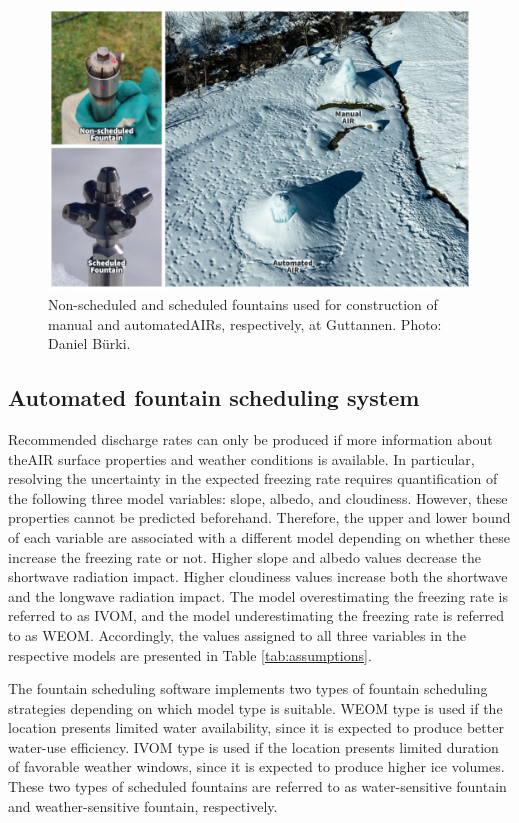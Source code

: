 \begin{figure}[htb]
	\includegraphics[width=\textwidth]{figs/AIR_fountains.jpg}
	\caption{Non-scheduled and scheduled fountains used for construction of manual and automated\ac{AIRs}, respectively, at
		Guttannen. Photo: Daniel Bürki.}
	\label{fig:autovsman}
\end{figure}

\subsection{Automated fountain scheduling system}

Recommended discharge rates can only be produced if more information about the\ac{AIR} surface properties and
weather conditions is available. In particular, resolving the uncertainty in the expected freezing rate requires
quantification of the following three model variables: slope, albedo, and cloudiness. However, these properties
cannot be predicted beforehand. Therefore, the upper and lower bound of each variable are associated with a
different model depending on whether these increase the freezing rate or not.  Higher slope and albedo values
decrease the shortwave radiation impact. Higher cloudiness values increase both the shortwave and the longwave
radiation impact. The model overestimating the freezing rate is referred to as \ac{IVOM}, and the model
underestimating the freezing rate is referred to as  \ac{WEOM}. Accordingly, the values
assigned to all three variables in the respective models are presented in Table \ref{tab:assumptions}.

The fountain scheduling software implements two types of fountain scheduling strategies depending on which
model type is suitable. \ac{WEOM} type is used if the location presents limited water availability, since it is expected to
produce better water-use efficiency. \ac{IVOM} type is used if the location presents limited duration of favorable
weather windows, since it is expected to produce higher ice volumes. These two types of scheduled fountains are referred to as water-sensitive fountain and weather-sensitive fountain, respectively.

